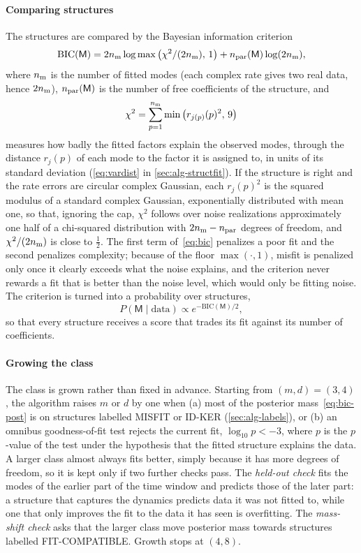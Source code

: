 \documentclass[11pt]{article}
\theoremstyle{plain}
\theoremstyle{definition}
\theoremstyle{remark}
\newcommand{\Mfit}{\mathsf{M}}              %
\newcommand{\lab}[1]{\textsf{#1}}           %
\newcommand{\FC}{\lab{FIT-COMPATIBLE}}
\newcommand{\IDK}{\lab{ID-KER}}
\newcommand{\MIS}{\lab{MISFIT}}
\begin{document}
\paragraph{Comparing structures} The structures are compared by the Bayesian information criterion
\begin{equation}\label{eq:bic}
  \mathrm{BIC}(\Mfit)=2n_{\rm m}\log\max\big(\chi^2/(2n_{\rm m}),\,1\big)+n_{\rm par}(\Mfit)\log(2n_{\rm m}),
\end{equation}
where $n_{\rm m}$ is the number of fitted modes (each complex rate gives two real data, hence $2n_{\rm m}$),
$n_{\rm par}(\Mfit)$ is the number of free coefficients of the structure, and
\[
  \chi^2=\sum_{p=1}^{n_{\rm m}}\min\big(r_{j(p)}(p)^2,\,9\big)
\]
measures how badly the fitted factors explain the observed modes, through the distance $r_j(p)$ of each mode to the
factor it is assigned to, in units of its standard deviation (\eqref{eq:vardist} in \cref{sec:alg-structfit}). If the
structure is right and the rate errors are circular complex Gaussian, each $r_j(p)^2$ is the squared modulus of a
standard complex Gaussian, exponentially distributed with mean one, so that, ignoring the cap, $\chi^2$ follows over
noise realizations approximately one half of a chi-squared distribution with $2n_{\rm m}-n_{\rm par}$ degrees of
freedom, and $\chi^2/(2n_{\rm m})$ is close to $\tfrac12$. The first term of~\eqref{eq:bic} penalizes a poor fit and the
second penalizes complexity; because of the floor $\max(\cdot,1)$, misfit is penalized only once it clearly exceeds what
the noise explains, and the criterion never rewards a fit that is better than the noise level, which would only be
fitting noise. The criterion is turned into a
probability over structures,
\begin{equation}\label{eq:bic-post}
  P(\Mfit\mid\text{data})\propto e^{-\mathrm{BIC}(\Mfit)/2},
\end{equation}
so that every structure receives a score that trades its fit against its number of coefficients.

\paragraph{Growing the class} The class is grown rather than fixed in advance. Starting from $(m,d)=(3,4)$, the
algorithm raises $m$ or $d$ by one when (a) most of the posterior mass~\eqref{eq:bic-post} is on structures labelled
\MIS{} or \IDK{} (\cref{sec:alg-labels}), or (b) an omnibus goodness-of-fit test rejects the current fit,
$\log_{10}p<-3$, where $p$ is the $p$-value of the test under the hypothesis that the fitted structure explains the data.
A larger class almost always fits better, simply because it has more degrees of freedom, so it is kept only if two
further checks pass. The \emph{held-out check} fits the modes of the earlier part of the time window and predicts those
of the later part: a structure that captures the dynamics predicts data it was not fitted to, while one that
only improves the fit to the data it has seen is overfitting. The \emph{mass-shift check} asks that the larger class
move posterior mass towards structures labelled \FC. Growth stops at $(4,8)$.
\end{document}
